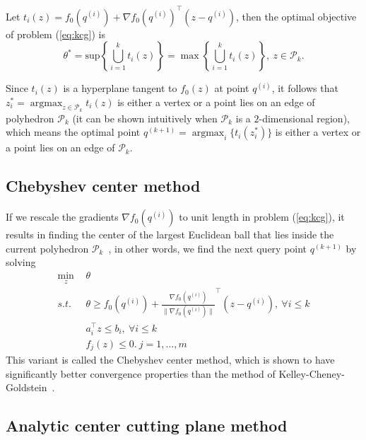\documentclass[9pt]{extarticle}
\DeclareMathOperator*{\argmax}{argmax}
\begin{document}
Let $t_i(z) = f_0(q^{(i)}) + \nabla f_0(q^{(i)})^\top (z - q^{(i)})$,
then the optimal objective of problem (\ref{eq:kcg}) is 
\begin{equation*}
\theta^* = \text{sup} \left\{ \bigcup_{i=1}^k t_i(z) \right\} = \max \left\{ \bigcup_{i=1}^k t_i(z) \right\},~ z \in \mathcal{P}_k.
\end{equation*}

Since $t_i(z)$ is a hyperplane tangent to $f_0(z)$ at point $q^{(i)}$, 
it follows that $z_i^* = \argmax_{z \in \mathcal{P}_k} t_i(z)$ is either a vertex or a point lies on an edge of polyhedron $\mathcal{P}_k$
(it can be shown intuitively when $\mathcal{P}_k$ is a $2$-dimensional region),
which means the optimal point $q^{(k+1)} = \argmax_{i} \{ t_i(z_i^*) \}$ is either a vertex or a point lies on an edge of $\mathcal{P}_k$.


\subsection{Chebyshev center method}
\label{sec:chebyshev}

If we rescale the gradients $\nabla f_0(q^{(i)})$ to unit length in problem (\ref{eq:kcg}), 
it results in finding the center of the largest Euclidean ball that lies inside the current polyhedron $\mathcal{P}_k$~\cite{elzinga1975central},
in other words, we find the next query point $q^{(k+1)}$ by solving
\begin{equation}
\label{eq:chebyshev}
\begin{aligned}
\min_{z} ~& \theta  \\
s.t.~~   ~& \theta \ge f_0(q^{(i)}) + \frac{\nabla f_0(q^{(i)})}{\|\nabla f_0(q^{(i)})\|} ^\top (z - q^{(i)}),~ \forall i \le k \\
          & a_i^\top z \le b_i,~ \forall i \le k \\
          & f_j(z) \le 0.~ j = 1, \dots, m
\end{aligned}
\end{equation}
This variant is called the Chebyshev center method, which is shown to have significantly better convergence properties than the method of Kelley-Cheney-Goldstein~\cite{goffin2002convex}.


\subsection{Analytic center cutting plane method}
\label{sec:accpm}
\end{document}
